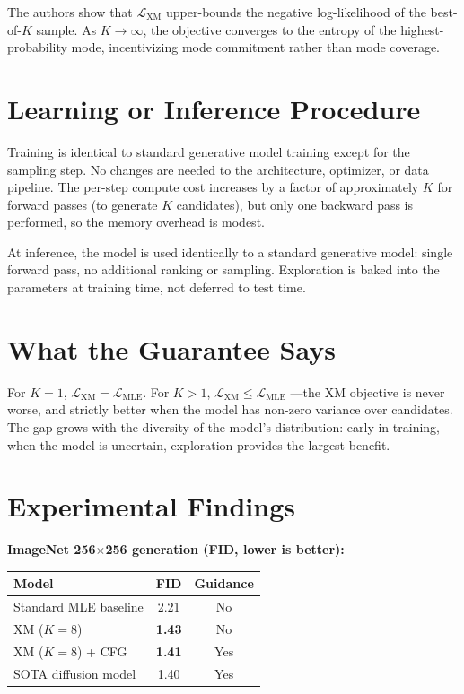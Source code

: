 \documentclass[10pt,twocolumn]{article}
\begin{document}
The authors show that $\mathcal{L}_{\text{XM}}$ upper-bounds the
negative log-likelihood of the best-of-$K$ sample. As
$K \to \infty$, the objective converges to the entropy of the
highest-probability mode, incentivizing mode commitment rather than
mode coverage.

\section{Learning or Inference Procedure}

Training is identical to standard generative model training except for the
sampling step. No changes are needed to the architecture, optimizer, or
data pipeline. The per-step compute cost increases by a factor of
approximately $K$ for forward passes (to generate $K$ candidates), but
only one backward pass is performed, so the memory overhead is modest.

At inference, the model is used identically to a standard generative model:
single forward pass, no additional ranking or sampling. Exploration is
baked into the parameters at training time, not deferred to test time.

\section{What the Guarantee Says}

For $K=1$, $\mathcal{L}_{\text{XM}} = \mathcal{L}_{\text{MLE}}$.
For $K > 1$, $\mathcal{L}_{\text{XM}} \leq \mathcal{L}_{\text{MLE}}$
---the XM objective is never worse, and strictly better when the model
has non-zero variance over candidates. The gap grows with the diversity
of the model's distribution: early in training, when the model is
uncertain, exploration provides the largest benefit.

\section{Experimental Findings}

\textbf{ImageNet 256$\times$256 generation (FID, lower is better):}

\begin{center}\small
\begin{tabular}{lcc}
\toprule
Model & FID & Guidance \\
\midrule
Standard MLE baseline & 2.21 & No \\
XM ($K=8$) & \textbf{1.43} & No \\
XM ($K=8$) + CFG & \textbf{1.41} & Yes \\
SOTA diffusion model & 1.40 & Yes \\
\bottomrule
\end{tabular}
\end{center}
\end{document}
